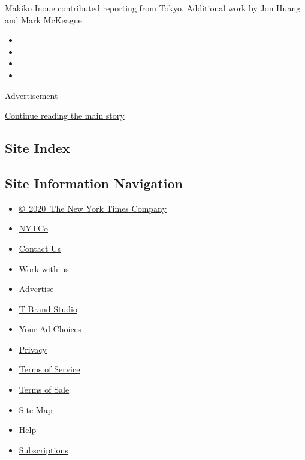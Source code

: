Makiko Inoue contributed reporting from Tokyo. Additional work by Jon
Huang and Mark McKeague.

\begin{itemize}
\item
\item
\item
\item
\end{itemize}

Advertisement

\protect\hyperlink{after-bottom}{Continue reading the main story}

\hypertarget{site-index}{%
\subsection{Site Index}\label{site-index}}

\hypertarget{site-information-navigation}{%
\subsection{Site Information
Navigation}\label{site-information-navigation}}

\begin{itemize}
\tightlist
\item
  \href{https://help.nytimes.com/hc/en-us/articles/115014792127-Copyright-notice}{©~2020~The
  New York Times Company}
\end{itemize}

\begin{itemize}
\tightlist
\item
  \href{https://www.nytco.com/}{NYTCo}
\item
  \href{https://help.nytimes.com/hc/en-us/articles/115015385887-Contact-Us}{Contact
  Us}
\item
  \href{https://www.nytco.com/careers/}{Work with us}
\item
  \href{https://nytmediakit.com/}{Advertise}
\item
  \href{http://www.tbrandstudio.com/}{T Brand Studio}
\item
  \href{https://www.nytimes.com/privacy/cookie-policy\#how-do-i-manage-trackers}{Your
  Ad Choices}
\item
  \href{https://www.nytimes.com/privacy}{Privacy}
\item
  \href{https://help.nytimes.com/hc/en-us/articles/115014893428-Terms-of-service}{Terms
  of Service}
\item
  \href{https://help.nytimes.com/hc/en-us/articles/115014893968-Terms-of-sale}{Terms
  of Sale}
\item
  \href{https://spiderbites.nytimes.com}{Site Map}
\item
  \href{https://help.nytimes.com/hc/en-us}{Help}
\item
  \href{https://www.nytimes.com/subscription?campaignId=37WXW}{Subscriptions}
\end{itemize}
